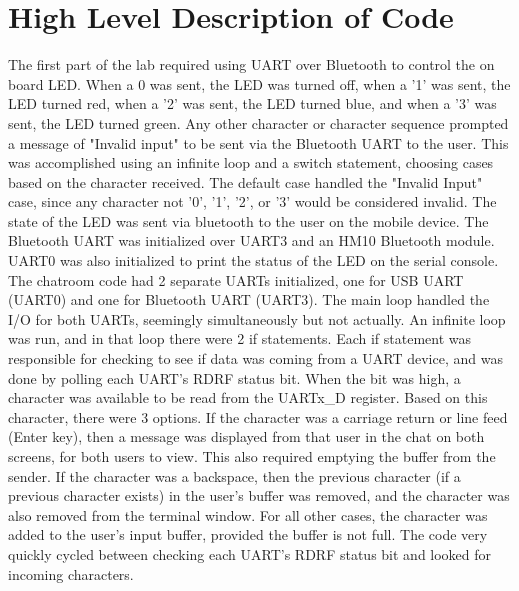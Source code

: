 \documentclass[CMPE]{KGCOEReport}
\begin{document}
\section*{High Level Description of Code}
The first part of the lab required using UART over Bluetooth to control the on board LED. When a 0 was sent, the LED was turned off, when a '1' was sent, the LED turned red, when a '2' was sent, the LED turned blue, and when a '3' was sent, the LED turned green. Any other character or character sequence prompted a message of "Invalid input" to be sent via the Bluetooth UART to the user. This was accomplished using an infinite loop and a switch statement, choosing cases based on the character received. The default case handled the "Invalid Input" case, since any character not '0', '1', '2', or '3' would be considered invalid. The state of the LED was sent via bluetooth to the user on the mobile device. The Bluetooth UART was initialized over UART3 and an HM10 Bluetooth module. UART0 was also initialized to print the status of the LED on the serial console. \\

The chatroom code had 2 separate UARTs initialized, one for USB UART (UART0) and one for Bluetooth UART (UART3). The main loop handled the I/O for both UARTs, seemingly simultaneously but not actually. An infinite loop was run, and in that loop there were 2 if statements. Each if statement was responsible for checking to see if data was coming from a UART device, and was done by polling each UART's RDRF status bit. When the bit was high, a character was available to be read from the UARTx\_D register. Based on this character, there were 3 options. If the character was a carriage return or line feed (Enter key), then a message was displayed from that user in the chat on both screens, for both users to view. This also required emptying the buffer from the sender. If the character was a backspace, then the previous character (if a previous character exists) in the user's buffer was removed, and the character was also removed from the terminal window. For all other cases, the character was added to the user's input buffer, provided the buffer is not full. The code very quickly cycled between checking each UART's RDRF status bit and looked for incoming characters. 
\end{document}
